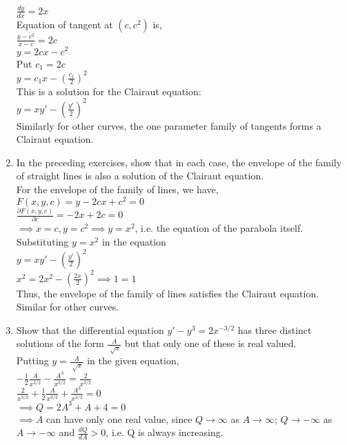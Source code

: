 \documentclass[a4paper]{article}
\begin{document}
\begin{enumerate}
{\\$\frac{dy}{dx}=2x$
\\Equation of tangent at $(c, c^2)$ is,
\\$\frac{y-c^2}{x-c}=2c$
\\$y=2cx-c^2$
\\Put $c_1=2c$
\\$y=c_1x-(\frac{c_1}{2})^2$
\\This is a solution for the Clairaut equation:
\\$y=xy'-(\frac{y'}{2})^2$
\\Similarly for other curves, the one parameter family of tangents forms a Clairaut equation.
}

\item{In the preceding exercises, show that in each case, the envelope of the family of straight lines is also a solution of the Clairaut equation.
\\For the envelope of the family of lines, we have,
\\$F(x,y,c)=y-2cx+c^2=0$
\\$\frac{\partial F(x,y,c)}{\partial c}=-2x+2c=0$
\\$\implies x=c, y=c^2 \implies y=x^2$, i.e. the equation of the parabola itself.
\\Substituting $y=x^2$ in the equation
\\$y=xy'-(\frac{y'}{2})^2$
\\$x^2=2x^2-(\frac{2x}{2})^2 \implies 1=1$ 
\\Thus, the envelope of the family of lines satisfies the Clairaut equation.
\\Similar for other curves.
}

\item{Show that the differential equation $y'-y^3=2x^{-3/2}$ has three distinct solutions of the form $\frac{A}{\sqrt[]{x}}$ but that only one of these is real valued.
\\Putting $y=\frac{A}{\sqrt[]{x}}$ in the given equation,
\\$-\frac{1}{2}\frac{A}{x^{3/2}}-\frac{A^3}{x^{3/2}}=\frac{2}{x^{3/2}}$
\\$\frac{2}{x^{3/2}}+\frac{1}{2}\frac{A}{x^{3/2}}+\frac{A^3}{x^{3/2}}=0$
\\$\implies Q=2A^3+A+4=0$
\\$\implies A$ can have only one real value, since $Q \rightarrow \infty$ as $A \rightarrow \infty$; $Q \rightarrow -\infty$ as $A \rightarrow -\infty$ and $\frac{dQ}{dA}>0$, i.e. Q is always increasing.
}
\end{enumerate}
\end{document}

